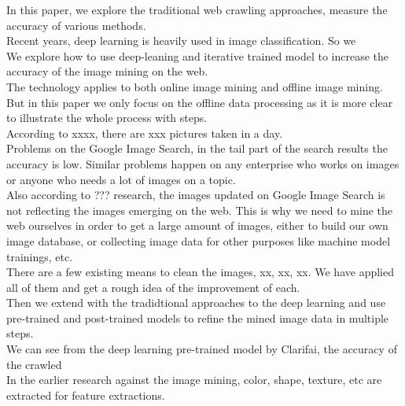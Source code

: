 \documentclass[paper=a4, fontsize=11pt]{scrartcl}
\numberwithin{equation}{section}		%
\numberwithin{figure}{section}			%
\numberwithin{table}{section}				%
\begin{document}
\noindent In this paper, we explore the traditional web crawling approaches, measure the accuracy of various methods.\\

\noindent Recent years, deep learning is heavily used in image classification. So we \\

\noindent We explore how to use deep-leaning and iterative trained model to increase the accuracy of the image mining on the web.\\

\noindent The technology applies to both online image mining and offline image mining. But in this paper we only focus on the offline data processing as it is more clear to illustrate the whole process with steps. \\

\noindent According to xxxx, there are xxx pictures taken in a day.\\

\noindent Problems on the Google Image Search, in the tail part of the search results the accuracy is low. Similar problems happen on any enterprise who works on images or anyone who needs a lot of images on a topic.\\

\noindent Also according to ??? research, the images updated on Google Image Search is not reflecting the images emerging on the web. This is why we need to mine the web ourselves in order to get a large amount of images, either to build our own image database, or collecting image data for other purposes like machine model trainings, etc.\\

\noindent There are a few existing means to clean the images, xx, xx, xx. We have applied all of them and get a rough idea of the improvement of each.\\

\noindent Then we extend with the tradidtional approaches to the deep learning and use pre-trained and post-trained models to refine the mined image data in multiple steps.\\

\noindent We can see from the deep learning pre-trained model by Clarifai, the accuracy of the crawled \\

\noindent In the earlier research against the image mining, color, shape, texture, etc are extracted for feature extractions.
\end{document}
